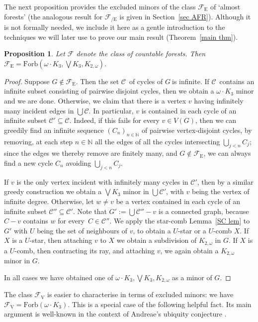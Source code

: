 \documentclass{article}
\newcommand{\forb}[1]{\mathrm{Forb}(#1)}
\newcommand{\frs}{\mathcal{F}}
\newcommand{\frsV}{\frs_\mathrm{V}}
\newcommand{\frsE}{\frs_\mathrm{E}}
\newcommand{\frsCE}{\frs_\mathrm{{/E}}}
\newcommand{\omdot}{\omega \cdot}
\newtheorem{proposition}{Proposition}[section]
\newcommand{\N}{\ensuremath{\mathbb N}}
\newcommand{\cc}{\ensuremath{\mathcal C}}
\newcommand{\seq}[1]{\ensuremath{(#1_n)_{n\in\N}}}
\newcommand{\g}{\ensuremath{G\ }}
\newcommand{\G}{\ensuremath{G}}
\newcommand{\Lr}[1]{Lemma~\ref{#1}}
\newcommand{\Tr}[1]{Theorem~\ref{#1}}
\newcommand{\Sr}[1]{Section~\ref{#1}}
\newcommand{\fe}{for every}
\begin{document}
\medskip

The next proposition provides the excluded minors of the class $\frsE$ of `almost forests' (the analogous result for $\frsCE$ is given in \Sr{sec AFR}).
Although it is not formally needed, we include it here as a gentle introduction to the techniques we will later use to prove our main result (\Tr{main thm}).


\begin{proposition} \label{prop FE}
Let $\frs$ denote the class of countable forests. Then $\frsE= \forb{\omdot K_3, \bigvee K_3, K_{2,\omega}}$.
\end{proposition}
\begin{proof}
Suppose $G\not\in \frsE$. Then the set \cc\ of cycles of \g is infinite. If \cc\ contains an infinite subset consisting of pairwise disjoint cycles, then we obtain a $\omdot K_3$ minor and we are done. Otherwise, we claim that there is a vertex $v$ having infinitely many incident edges in $\bigcup \cc$. In particular, $v$ is contained in each cycle of an infinite subset $\cc' \subseteq \cc$. Indeed, if this fails for every $v\in V(G)$, then we can greedily find an infinite sequence \seq{C} of pairwise vertex-disjoint cycles, by removing, at each step $n\in \N$ all the edges of all the cycles intersecting $\bigcup_{j<n} C_j$; since the edges we thereby remove are finitely many, and  $G\not\in \frsE$, we can always find a new cycle $C_n$ avoiding $\bigcup_{j<n} C_j$.

If $v$ is the only vertex incident with infinitely many cycles in $\cc'$, then by a similar greedy construction we obtain a $\bigvee K_3$ minor in $\bigcup \cc'$, with $v$ being the vertex of infinite degree. Otherwise, let $w\neq v$ be a vertex contained in each cycle of an infinite subset $\cc'' \subseteq \cc'$. Note that $G':= \bigcup \cc'' - v$ is a connected graph, because $C - v$ contains $w$ \fe\ $C\in \cc''$. We apply the star-comb \Lr{SC lem} to $G'$ with $U$ being the set of neighbours of $v$, to obtain a $U$-star or a $U$-comb $X$. If $X$ is a $U$-star, then attaching $v$ to $X$ we obtain a subdivision of $K_{2,\omega}$ in \G. If $X$ is a $U$-comb, then contracting its ray, and attaching $v$, we again obtain a $K_{2,\omega}$ minor in \G. 

In all cases we have obtained one of $\omdot K_3, \bigvee K_3, K_{2,\omega}$ as a minor of \G.
\end{proof}

The class $\frsV$ is easier to characterise in terms of excluded minors: we have $\frsV= \forb{\omdot K_3}$. This is a special case of the following helpful fact. Its main argument is well-known in the context of Andreae's ubiquity conjecture \cite{AndUb}.
\end{document}
